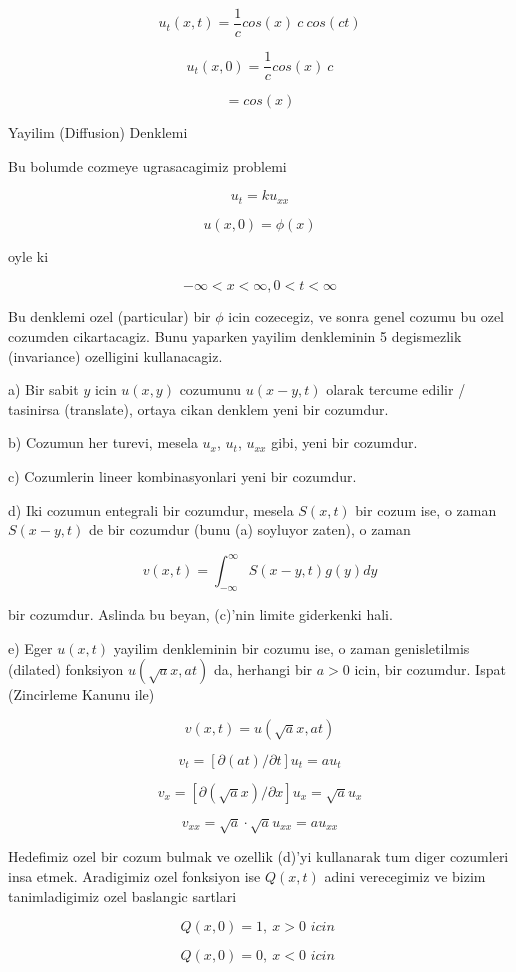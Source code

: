 \documentclass[12pt,fleqn]{article}
\begin{document}
\[ u_t(x,t) = \frac{1}{c}cos(x) \ c \ cos(ct) \]

\[ u_t(x,0) = \frac{1}{c}cos(x) \ c \]

\[  = cos(x) \]


Yayilim (Diffusion) Denklemi

Bu bolumde cozmeye ugrasacagimiz problemi

\[  u_t = k u_{xx}  \]

\[ u(x,0) = \phi(x) \]

oyle ki 

\[ -\infty < x < \infty, 0 < t < \infty \]

Bu denklemi ozel (particular) bir $\phi$ icin cozecegiz, ve sonra genel
cozumu bu ozel cozumden cikartacagiz. Bunu yaparken yayilim denkleminin 5
degismezlik (invariance) ozelligini kullanacagiz. 

a) Bir sabit $y$ icin $u(x,y)$ cozumunu $u(x-y,t)$ olarak tercume edilir /
tasinirsa (translate), ortaya cikan denklem yeni bir cozumdur.

b) Cozumun her turevi, mesela $u_x$, $u_t$, $u_{xx}$ gibi, yeni bir
cozumdur. 

c) Cozumlerin lineer kombinasyonlari yeni bir cozumdur. 

d) Iki cozumun entegrali bir cozumdur, mesela $S(x,t)$ bir cozum ise, o
zaman $S(x-y,t)$ de bir cozumdur (bunu (a) soyluyor zaten), o zaman 

\[ v(x,t) = \int_{-\infty}^{\infty}S(x-y,t)g(y) dy   \]

bir cozumdur. Aslinda bu beyan, (c)'nin limite giderkenki hali. 

e) Eger $u(x,t)$ yayilim denkleminin bir cozumu ise, o zaman genisletilmis
(dilated) fonksiyon $u(\sqrt{a} x, at)$ da, herhangi bir $a>0$ icin, bir
cozumdur. Ispat (Zincirleme Kanunu ile)

\[ v(x,t) =  u(\sqrt{a} x, at) \]

\[ v_t = [\partial(at) / \partial t]u_t = au_t \]

\[ v_x = [\partial(\sqrt{a}x) / \partial x]u_x = \sqrt{a}u_x \]

\[ v_{xx} = \sqrt{a} \cdot \sqrt{a} u_{xx} = a u_{xx} \]

Hedefimiz ozel bir cozum bulmak ve ozellik (d)'yi kullanarak tum diger
cozumleri insa etmek. Aradigimiz ozel fonksiyon ise $Q(x,t)$ adini
verecegimiz ve bizim tanimladigimiz ozel baslangic sartlari

\[ Q(x,0) = 1, \ x>0 \textit{ icin } \]

\[ Q(x,0)=0, \ x<0 \textit{ icin }  \]
\end{document}
